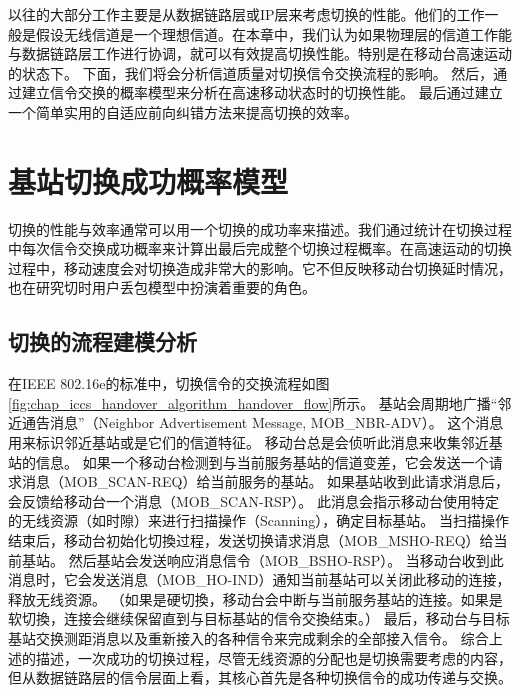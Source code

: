 以往的大部分工作主要是从数据链路层或IP层来考虑切换的性能。他们的工作一般是假设无线信道是一个理想信道。在本章中，我们认为如果物理层的信道工作能与数据链路层工作进行协调，就可以有效提高切换性能。特别是在移动台高速运动的状态下。
下面，我们将会分析信道质量对切换信令交换流程的影响。
然后，通过建立信令交换的概率模型来分析在高速移动状态时的切换性能。
最后通过建立一个简单实用的自适应前向纠错方法来提高切换的效率。


\section{基站切换成功概率模型}
\label{section_iccs_handover_algorithm_mobility_analysis}
切换的性能与效率通常可以用一个切换的成功率来描述。我们通过统计在切换过程中每次信令交换成功概率来计算出最后完成整个切换过程概率。在高速运动的切换过程中，移动速度会对切换造成非常大的影响。它不但反映移动台切换延时情况，也在研究切时用户丢包模型中扮演着重要的角色。
\subsection{切换的流程建模分析}
\label{subsection_iccs_handover_algorithm_mobility_analysis_handover_flow}
在IEEE 802.16e的标准中，切换信令的交换流程如图\ref{fig:chap_iccs_handover_algorithm_handover_flow}所示。
基站会周期地广播“邻近通告消息”（Neighbor Advertisement Message, MOB\_NBR-ADV）。
这个消息用来标识邻近基站或是它们的信道特征。
移动台总是会侦听此消息来收集邻近基站的信息。
如果一个移动台检测到与当前服务基站的信道变差，它会发送一个请求消息（MOB\_SCAN-REQ）给当前服务的基站。
如果基站收到此请求消息后，会反馈给移动台一个消息（MOB\_SCAN-RSP）。
此消息会指示移动台使用特定的无线资源（如时隙）来进行扫描操作（Scanning），确定目标基站。
当扫描操作结束后，移动台初始化切換过程，发送切换请求消息（MOB\_MSHO-REQ）给当前基站。
然后基站会发送响应消息信令（MOB\_BSHO-RSP）。
当移动台收到此消息时，它会发送消息（MOB\_HO-IND）通知当前基站可以关闭此移动的连接，释放无线资源。
（如果是硬切換，移动台会中断与当前服务基站的连接。如果是软切換，连接会继续保留直到与目标基站的信令交換结束。）
最后，移动台与目标基站交换测距消息以及重新接入的各种信令来完成剩余的全部接入信令。
综合上述的描述，一次成功的切换过程，尽管无线资源的分配也是切换需要考虑的内容，
但从数据链路层的信令层面上看，其核心首先是各种切换信令的成功传递与交换。

